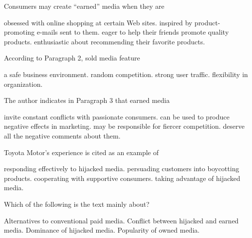 \item Consumers may create ``earned'' media when they are
\begin{tasks}
	\task obsessed with online shopping at certain Web sites.
	\task inspired by product-promoting e-mails sent to them.
	\task eager to help their friends promote quality products.
	\task enthusiastic about recommending their favorite products.
\end{tasks}
\item According to Paragraph 2, sold media feature
\begin{tasks}
	\task a safe business environment.
	\task random competition.
	\task strong user traffic.
	\task flexibility in organization.
\end{tasks}
\item The author indicates in Paragraph 3 that earned media
\begin{tasks}
	\task invite constant conflicts with passionate consumers.
	\task can be used to produce negative effects in marketing.
	\task may be responsible for fiercer competition.
	\task deserve all the negative comments about them.
\end{tasks}
\item Toyota Motor's experience is cited as an example of
\begin{tasks}
	\task responding effectively to hijacked media.
	\task persuading customers into boycotting products.
	\task cooperating with supportive consumers.
	\task taking advantage of hijacked media.
\end{tasks}
\item Which of the following is the text mainly about?
\begin{tasks}
	\task Alternatives to conventional paid media.
	\task Conflict between hijacked and earned media.
	\task Dominance of hijacked media.
	\task Popularity of owned media.
\end{tasks}
